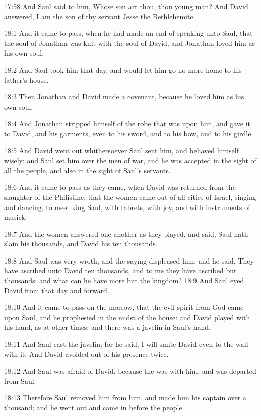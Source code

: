 17:58 And Saul said to him, Whose son art thou, thou young man? And
David answered, I am the son of thy servant Jesse the Bethlehemite.

18:1 And it came to pass, when he had made an end of speaking unto
Saul, that the soul of Jonathan was knit with the soul of David, and
Jonathan loved him as his own soul.

18:2 And Saul took him that day, and would let him go no more home to
his father's house.

18:3 Then Jonathan and David made a covenant, because he loved him as
his own soul.

18:4 And Jonathan stripped himself of the robe that was upon him, and
gave it to David, and his garments, even to his sword, and to his bow,
and to his girdle.

18:5 And David went out whithersoever Saul sent him, and behaved
himself wisely: and Saul set him over the men of war, and he was
accepted in the sight of all the people, and also in the sight of
Saul's servants.

18:6 And it came to pass as they came, when David was returned from
the slaughter of the Philistine, that the women came out of all cities
of Israel, singing and dancing, to meet king Saul, with tabrets, with
joy, and with instruments of musick.

18:7 And the women answered one another as they played, and said, Saul
hath slain his thousands, and David his ten thousands.

18:8 And Saul was very wroth, and the saying displeased him; and he
said, They have ascribed unto David ten thousands, and to me they have
ascribed but thousands: and what can he have more but the kingdom?
18:9 And Saul eyed David from that day and forward.

18:10 And it came to pass on the morrow, that the evil spirit from God
came upon Saul, and he prophesied in the midst of the house: and David
played with his hand, as at other times: and there was a javelin in
Saul's hand.

18:11 And Saul cast the javelin; for he said, I will smite David even
to the wall with it. And David avoided out of his presence twice.

18:12 And Saul was afraid of David, because the \LORD was with him, and
was departed from Saul.

18:13 Therefore Saul removed him from him, and made him his captain
over a thousand; and he went out and came in before the people.

